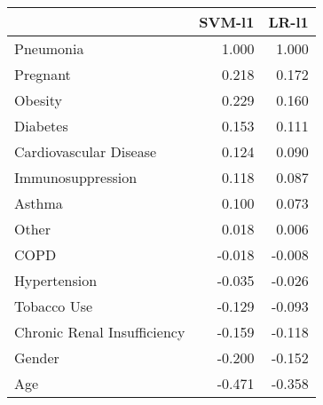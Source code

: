 \begin{tabular}{lrr}
\toprule
{} &  SVM-l1 &  LR-l1 \\
\midrule
Pneumonia                   &   1.000 &  1.000 \\
Pregnant                    &   0.218 &  0.172 \\
Obesity                     &   0.229 &  0.160 \\
Diabetes                    &   0.153 &  0.111 \\
Cardiovascular Disease      &   0.124 &  0.090 \\
Immunosuppression           &   0.118 &  0.087 \\
Asthma                      &   0.100 &  0.073 \\
Other                       &   0.018 &  0.006 \\
COPD                        &  -0.018 & -0.008 \\
Hypertension                &  -0.035 & -0.026 \\
Tobacco Use                 &  -0.129 & -0.093 \\
Chronic Renal Insufficiency &  -0.159 & -0.118 \\
Gender                      &  -0.200 & -0.152 \\
Age                         &  -0.471 & -0.358 \\
\bottomrule
\end{tabular}
